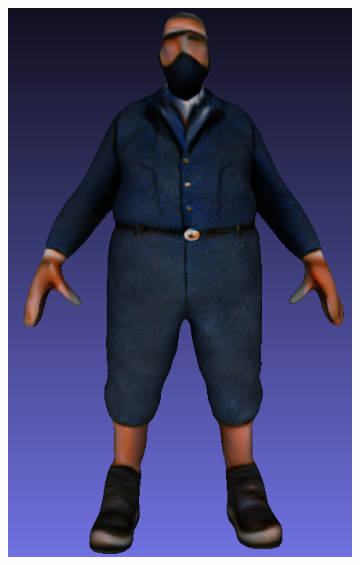 \begin{figure}[ht]
\begin{subfigure}[b]{0.1721\textwidth}
        \includegraphics[width=\textwidth]{figures/appendix/bias_poor_genie_2.png}
        \caption{}
    \end{subfigure}
    \begin{subfigure}[b]{0.172\textwidth}
        \centering

\end{subfigure}
\end{figure}
